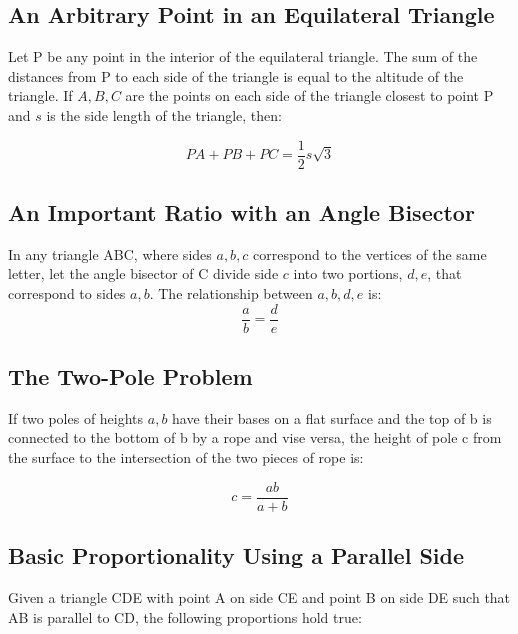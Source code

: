 \documentclass[final, letterpaper, 12pt]{article}
\begin{document}
	\subsection{An Arbitrary Point in an Equilateral Triangle}\label{sec: properties of a point inside an equilateral triangle}
		Let P be any point in the interior of the equilateral triangle. The sum of the distances from P to each side of the triangle is equal to the altitude of the triangle. If $A, B, C$ are the points on each side of the triangle closest to point P and $s$ is the side length of the triangle, then:
		
		\begin{equation}
			PA + PB + PC = \frac{1}{2}s\sqrt{3}
		\end{equation}
	
	\subsection{An Important Ratio with an Angle Bisector}\label{sec: a ratio concerning an angle bisector in a triangle}
		In any triangle ABC, where sides $a, b, c$ correspond to the vertices of the same letter, let the angle bisector of C divide side $c$ into two portions, $d, e$, that correspond to sides $a, b$. The relationship between $a, b, d, e$ is:
		\begin{equation}
			\frac{a}{b} = \frac{d}{e}
		\end{equation}
	
	\subsection{The Two-Pole Problem}\label{sec: two poles connected to the base of the other pole}
		If two poles of heights $a, b$ have their bases on a flat surface and the top of b is connected to the bottom of b by a rope and vise versa, the height of pole c from the surface to the intersection of the two pieces of rope is:
		
		\begin{equation}
			c = \frac{ab}{a+b}
		\end{equation}
	
	\subsection{Basic Proportionality Using a Parallel Side}\label{sec: proportionality with a parallel intersection in a triangle}
		Given a triangle CDE with point A on side CE and point B on side DE such that AB is parallel to CD, the following proportions hold true:
		
\end{document}
